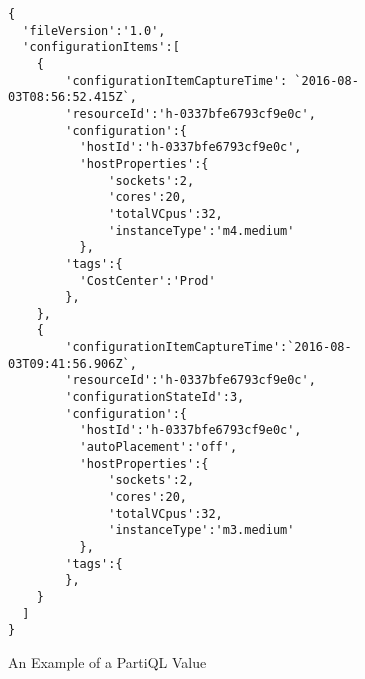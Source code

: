 \begin{figure}[htb!]
\begin{lstlisting}
{
  'fileVersion':'1.0',
  'configurationItems':[
    {
        'configurationItemCaptureTime': `2016-08-03T08:56:52.415Z`,
        'resourceId':'h-0337bfe6793cf9e0c',
        'configuration':{
          'hostId':'h-0337bfe6793cf9e0c',
          'hostProperties':{
              'sockets':2,
              'cores':20,
              'totalVCpus':32,
              'instanceType':'m4.medium'
          },
        'tags':{
          'CostCenter':'Prod'
        },
    },
    {
        'configurationItemCaptureTime':`2016-08-03T09:41:56.906Z`,
        'resourceId':'h-0337bfe6793cf9e0c',
        'configurationStateId':3,
        'configuration':{
          'hostId':'h-0337bfe6793cf9e0c',
          'autoPlacement':'off',
          'hostProperties':{
              'sockets':2,
              'cores':20,
              'totalVCpus':32,
              'instanceType':'m3.medium'
          },
        'tags':{
        },
    }
  ]
}
\end{lstlisting}
\caption{An Example of a PartiQL Value}
\label{figure:values:example-value}
\end{figure}
